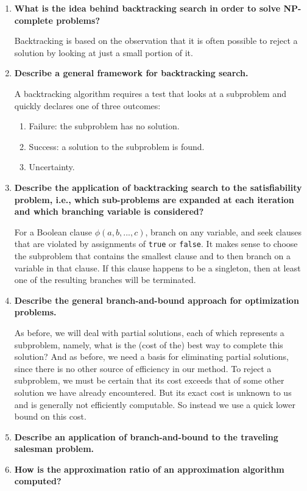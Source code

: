 \documentclass[a4paper,11pt]{article}
\begin{document}
\begin{enumerate}
\def\labelenumi{\arabic{enumi}.}
\item
  \textbf{What is the idea behind backtracking search in order to solve
  NP-complete problems?}

  Backtracking is based on the observation that it is often possible to
  reject a solution by looking at just a small portion of it.
\item
  \textbf{Describe a general framework for backtracking search.}

  A backtracking algorithm requires a test that looks at a subproblem
  and quickly declares one of three outcomes:

  \begin{enumerate}
  \def\labelenumii{\arabic{enumii}.}
  \itemsep1pt\parskip0pt
  \item
    Failure: the subproblem has no solution.
  \item
    Success: a solution to the subproblem is found.
  \item
    Uncertainty.
  \end{enumerate}
\item
  \textbf{Describe the application of backtracking search to the
  satisfiability problem, i.e., which sub-problems are expanded at each
  iteration and which branching variable is considered?}

  For a Boolean clause $\phi(a, b, ..., c)$, branch on any variable, and
  seek clauses that are violated by assignments of \texttt{true} or
  \texttt{false}. It makes sense to choose the subproblem that contains
  the smallest clause and to then branch on a variable in that clause.
  If this clause happens to be a singleton, then at least one of the
  resulting branches will be terminated.
\item
  \textbf{Describe the general branch-and-bound approach for
  optimization problems.}

  As before, we will deal with partial solutions, each of which
  represents a subproblem, namely, what is the (cost of the) best way to
  complete this solution? And as before, we need a basis for eliminating
  partial solutions, since there is no other source of efficiency in our
  method. To reject a subproblem, we must be certain that its cost
  exceeds that of some other solution we have already encountered. But
  its exact cost is unknown to us and is generally not efficiently
  computable. So instead we use a quick lower bound on this cost.
\item
  \textbf{Describe an application of branch-and-bound to the traveling
  salesman problem.}
\item
  \textbf{How is the approximation ratio of an approximation algorithm
  computed?}


\end{enumerate}
\end{document}
